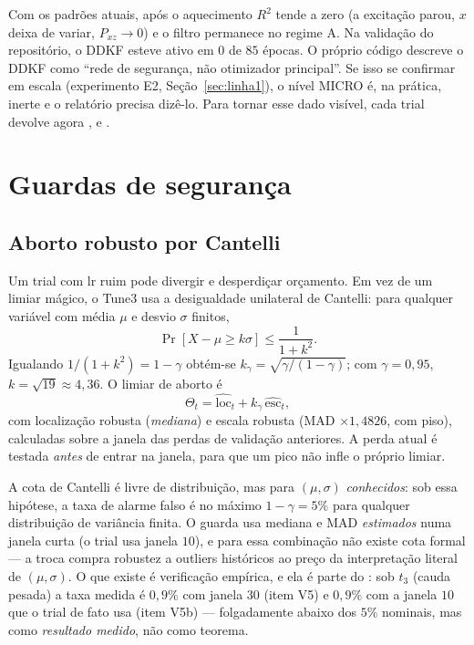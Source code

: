 \begin{alerta}
Com os padrões atuais, após o aquecimento $R^2$ tende a zero (a excitação parou, $x$ deixa de variar, $P_{xz}\to0$) e o filtro permanece no regime A. Na validação do repositório, o DDKF esteve ativo em $0$ de $85$ épocas. O próprio código descreve o DDKF como ``rede de segurança, não otimizador principal''. Se isso se confirmar em escala (experimento E2, Seção~\ref{sec:linha1}), o nível MICRO é, na prática, inerte e o relatório precisa dizê-lo. Para tornar esse dado visível, cada trial devolve agora ,  e .
\end{alerta}

\section{Guardas de segurança}\label{sec:guardas}

\subsection{Aborto robusto por Cantelli}
Um trial com lr ruim pode divergir e desperdiçar orçamento. Em vez de um limiar mágico, o Tune3 usa a desigualdade unilateral de Cantelli: para qualquer variável com média $\mu$ e desvio $\sigma$ finitos,
\[
\Pr[X-\mu\ge k\sigma]\le\frac{1}{1+k^2}.
\]
Igualando $1/(1+k^2)=1-\gamma$ obtém-se $k_\gamma=\sqrt{\gamma/(1-\gamma)}$; com $\gamma=0{,}95$, $k=\sqrt{19}\approx4{,}36$. O limiar de aborto é
\[
\Theta_t=\widehat{\text{loc}}_t+k_\gamma\,\widehat{\text{esc}}_t ,
\]
com localização robusta (\emph{mediana}) e escala robusta (MAD $\times1{,}4826$, com piso), calculadas sobre a janela das perdas de validação anteriores. A perda atual é testada \emph{antes} de entrar na janela, para que um pico não infle o próprio limiar.

\begin{observacao}\label{obs:cantelli}
A cota de Cantelli é livre de distribuição, mas para $(\mu,\sigma)$ \emph{conhecidos}: sob essa hipótese, a taxa de alarme falso é no máximo $1-\gamma=5\%$ para qualquer distribuição de variância finita. O guarda usa mediana e MAD \emph{estimados} numa janela curta (o trial usa janela $10$), e para essa combinação não existe cota formal --- a troca compra robustez a outliers históricos ao preço da interpretação literal de $(\mu,\sigma)$. O que existe é verificação empírica, e ela é parte do : sob $t_3$ (cauda pesada) a taxa medida é $0{,}9\%$ com janela $30$ (item V5) e $0{,}9\%$ com a janela $10$ que o trial de fato usa (item V5b) --- folgadamente abaixo dos $5\%$ nominais, mas como \emph{resultado medido}, não como teorema.
\end{observacao}

